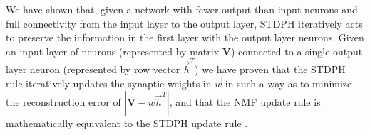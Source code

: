 We have shown that, given a network with fewer output than input neurons and full connectivity from the input layer to the output layer, \ac{STDPH} iteratively acts to preserve the information in the first layer with the output layer neurons.
Given an input layer of neurons (represented by matrix \textbf{V}) connected to a single output layer neuron (represented by 
row vector $\vec{h}^T$) we have proven that the \ac{STDPH} rule iteratively updates the synaptic weights in $\vec{w}$ in such a way as to minimize the reconstruction error of $|\mathbf{V} - \vec{w} \vec{h}^T|$, and that the \ac{NMF} update rule is mathematically equivalent to the \ac{STDPH} update rule \citep{Carlson2013}.





